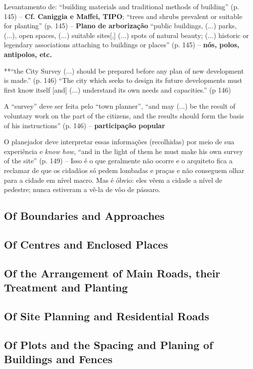 \documentclass[12pt, a4paper]{book} %
\begin{document}
        Levantamento de: ``building materials and traditional methods of building'' (p. 145) – \textbf{Cf. Caniggia e Maffei, TIPO}; 
        ``trees and shrubs prevalent or suitable for planting'' (p. 145) – \textbf{Plano de arborização}
        ``public buildings, (...) parks, (...), open spaces, (...) suitable sites[,] (...) spots of natural beauty; (...) historic or legendary associations attaching to buildings or places'' (p. 145) – \textbf{nós, polos, antipolos, etc.}

        **``the City Survey (...) should be prepared before any plan of new development is made.'' (p. 146)
        ``The city which seeks to design its future developments must first know itself [and] (...) understand its own needs and capacities.'' (p 146)

        A ``survey'' deve ser feita pelo ``town planner'', ``and may (...) be the result of voluntary work on the part of the citizens, and the results should form the basis of his instructions'' (p. 146) – \textbf{participação popular}

        O planejador deve interpretar essas informações (recolhidas) por meio de sua experiência e \textit{know how}, ``and in the light of them he must make his own survey of the site'' (p. 149) – Isso é o que geralmente não ocorre e o arquiteto fica a reclamar de que os cidadãos só pedem lombadas e praças e não conseguem olhar para a cidade em nível macro. Mas é óbvio: eles vêem a cidade a nível de pedestre; nunca estiveram a vê-la de vôo de pássaro.


        \subsection*{Of Boundaries and Approaches}
        \subsection*{Of Centres and Enclosed Places}
        \subsection*{Of the Arrangement of Main Roads, their Treatment and Planting}
        \subsection*{Of Site Planning and Residential Roads}
        \subsection*{Of Plots and the Spacing and Planing of Buildings and Fences}
\end{document}
